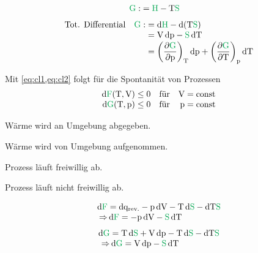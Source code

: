 \begin{defnbox}\nospacing
  \begin{defn}
    \begin{align}
      \Gpot:&=\Hpot-\Tz\Spot
    \end{align}
    \begin{align*}
      &\text{Tot. Differential}&\Gpot:&=\diff\Hpot-\diff(\Tz\Spot)\nalign
      &&&=\Vz\diff\pz-\Spot\diff\Tz\nalign
      &&&=\left(\pfrac{\Gpot}{\pz}\right)_{\Tz}\diff\pz+\left(\pfrac{\Gpot}{\Tz}\right)_{\pz}\diff\Tz
    \end{align*}
  \end{defn}
\end{defnbox}
\begin{sectionbox}\nospacing
  Mit \cref{eq:cl1,eq:cl2} folgt für die Spontanität von Prozessen
  \begin{align}
    \diff\Fpot(\Tz,\Vz)\leq0&&\text{für}&&\Vz=\text{const}\nalign
    \diff\Gpot(\Tz,\pz)\leq0&&\text{für}&&\pz=\text{const}
  \end{align}
\end{sectionbox}
\begin{notebox}
  Wärme wird an Umgebung abgegeben.
\end{notebox}
\begin{notebox}
  Wärme wird von Umgebung aufgenommen.
\end{notebox}
\begin{notebox}
  Prozess läuft freiwillig ab.
\end{notebox}
\begin{notebox}
  Prozess läuft nicht freiwillig ab.
\end{notebox}
\begin{notebox}[Bemerkung]\nospacing
  \begin{align*}
    \diff\Fpot&=\diff\qp_{\text{rev.}}-\pz\diff\Vz-\Tz\diff\Spot-\diff\Tz\Spot\nalign
                \Rightarrow&\diff\Fpot=-\pz\diff\Vz-\Spot\diff\Tz
  \end{align*}
  \begin{align*}
    \diff\Gpot&=\Tz\diff\Spot+\Vz\diff\pz-\Tz\diff\Spot-\diff\Tz\Spot\nalign
                \Rightarrow&\diff\Gpot=\Vz\diff\pz-\Spot\diff\Tz
  \end{align*}
\end{notebox}
